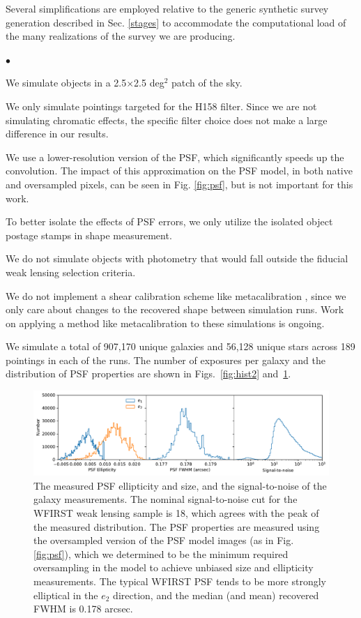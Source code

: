 \documentclass[usenatbib]{mnras}
\begin{document}
Several simplifications are employed relative to the generic synthetic survey generation described in Sec. \ref{stages} to accommodate the computational load of the many realizations of the survey we are producing. 
\begin{list}{$\bullet$}{}
\item We simulate objects in a 2.5$\times$2.5 deg$^2$ patch of the sky.
\item We only simulate pointings targeted for the H158 filter.
Since we are not simulating chromatic effects, the specific filter choice does not make a large difference in our results.
\item We use a lower-resolution version of the PSF, which significantly speeds up the convolution.
The impact of this approximation on the PSF model, in both native and oversampled pixels, can be seen in Fig. \ref{fig:psf}, but is not important for this work.
\item To better isolate the effects of PSF errors, we only utilize the isolated object postage stamps in shape measurement.
\item We do not simulate objects with photometry that would fall outside the fiducial weak lensing selection criteria.
\item We do not implement a shear calibration scheme like metacalibration \citep{SheldonHuff2017}, since we only care about changes to the recovered shape between simulation runs. Work on applying a method like metacalibration to these simulations is ongoing.
\end{list}

We simulate a total of 907,170 unique galaxies and 56,128 unique stars across 189 pointings in each of the runs. The number of exposures per galaxy and the distribution of PSF properties are shown in Figs.~\ref{fig:hist2} and~\ref{fig:hist3}.

\begin{figure}
\begin{center}
\includegraphics[width=\textwidth]{figures/hist3.pdf}
\end{center}
\caption[]{
The measured PSF ellipticity and size, and the signal-to-noise of the galaxy measurements. The nominal signal-to-noise cut for the WFIRST weak lensing sample is 18, which agrees with the peak of the measured distribution. The PSF properties are measured using the oversampled version of the PSF model images (as in Fig. \ref{fig:psf}), which we determined to be the minimum required oversampling in the model to achieve unbiased size and ellipticity measurements. The typical WFIRST PSF tends to be more strongly elliptical in the $e_2$ direction, and the median (and mean) recovered FWHM is 0.178 arcsec.
\label{fig:hist3}}
\end{figure}
\end{document}
